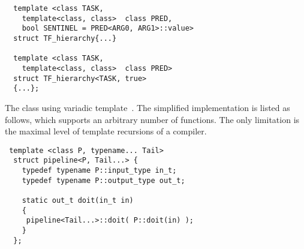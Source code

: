 \begin{lstlisting}
  template <class TASK,
    template<class, class>  class PRED,
    bool SENTINEL = PRED<ARG0, ARG1>::value>
  struct TF_hierarchy{...}

  template <class TASK,
    template<class, class>  class PRED>
  struct TF_hierarchy<TASK, true>
  {...};
\end{lstlisting}

The  class using variadic template~\cite{vartemp}. The
simplified implementation is listed as follows, which supports an arbitrary
number of functions. The only limitation is the maximal level of template
recursions of a compiler.


\begin{lstlisting}
 template <class P, typename... Tail>
  struct pipeline<P, Tail...> {
    typedef typename P::input_type in_t;
    typedef typename P::output_type out_t;
   
    static out_t doit(in_t in)
    {
     pipeline<Tail...>::doit( P::doit(in) );
    }
  };  
\end{lstlisting}

